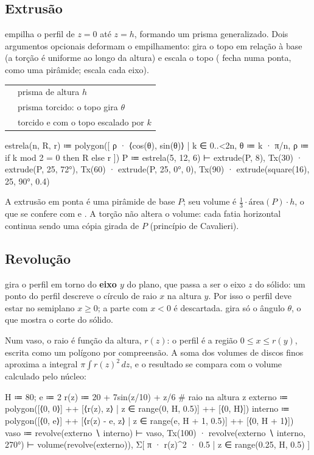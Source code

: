 \subsection{Extrusão}
 empilha o perfil de $z = 0$ até $z = h$, formando um prisma generalizado. Dois argumentos
opcionais deformam o empilhamento:  gira o topo em relação à base (a torção é uniforme ao longo da altura) e
 escala o topo ( fecha numa ponta, como uma pirâmide;  escala cada eixo).
\begin{longtable}{@{}L{0.36}L{0.64}@{}}
\toprule
{} & prisma de altura $h$ \\
 & prisma torcido: o topo gira $θ$ \\
 & torcido e com o topo escalado por $k$ \\
\bottomrule
\end{longtable}
\begin{csg}[run, id=extrusoes]
estrela(n, R, r) ≔ polygon([ ρ · ⟨cos(θ), sin(θ)⟩
                     | k ∈ 0..<2n, θ ≔ k · π/n, ρ ≔ if k mod 2 = 0 then R else r ])
P ≔ estrela(5, 12, 6)
⊢ extrude(P, 8), Tx(30) · extrude(P, 25, 72°), Tx(60) · extrude(P, 25, 0°, 0),
  Tx(90) · extrude(square(16), 25, 90°, 0.4)
\end{csg}
A extrusão em ponta é uma pirâmide de base $P$; seu volume é $\frac13 \cdot \text{área}(P) \cdot h$, o que se confere com
 e . A torção não altera o volume: cada fatia horizontal continua sendo uma cópia girada de $P$
(princípio de Cavalieri).

\subsection{Revolução}
 gira o perfil em torno do \textbf{eixo $y$} do plano, que passa a ser o eixo $z$ do sólido: um ponto
 do perfil descreve o círculo de raio $x$ na altura $y$. Por isso o perfil deve estar no semiplano
$x \ge 0$; a parte com $x < 0$ é descartada.  gira só o ângulo $θ$, o que mostra o corte do sólido.

Num vaso, o raio é função da altura, $r(z)$: o perfil é a região $0 \le x \le r(y)$, escrita como um polígono por
compreensão. A soma dos volumes de discos finos aproxima a integral $\pi\int r(z)^2\,dz$, e o resultado se compara com o
volume calculado pelo núcleo:
\begin{csg}[run, id=vaso]
H ≔ 80;  e ≔ 2
r(z) ≔ 20 + 7sin(z/10) + z/6       # raio na altura z
externo ≔ polygon([⟨0, 0⟩] ++ [⟨r(z), z⟩ | z ∈ range(0, H, 0.5)] ++ [⟨0, H⟩])
interno ≔ polygon([⟨0, e⟩] ++ [⟨r(z) - e, z⟩ | z ∈ range(e, H + 1, 0.5)] ++ [⟨0, H + 1⟩])
vaso ≔ revolve(externo ∖ interno)
⊢ vaso, Tx(100) · revolve(externo ∖ interno, 270°)
⊢ volume(revolve(externo)), Σ[ π · r(z)^2 · 0.5 | z ∈ range(0.25, H, 0.5) ]
\end{csg}

